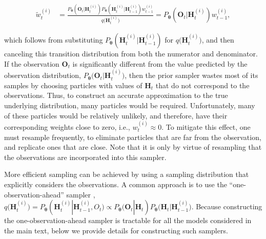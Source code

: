 \documentclass[10pt]{article}
\providecommand{\ve}[1]{\boldsymbol{#1}}
\providecommand{\ve}[1]{\boldsymbol{#1}}
\newcommand{\thetn}{\ve{\theta}}
\newcommand{\p}{P_{\thetn}}
\newcommand{\q}{q\big(\ve{H}_t^{(i)}\big)}
\begin{document}
\begin{align} \label{eq:prior_weights}
\widetilde{w}_t^{(i)} &= \frac{\p(\ve{O}_t | \ve{H}_t^{(i)})  \p(\ve{H}_t^{(i)} | \ve{H}_{t-1}^{(i)}) w_{t-1}^{(i)}}{\q} %
=\p(\ve{O}_t | \ve{H}_t^{(i)}) w_{t-1}^{(i)},
\end{align}

\noindent which follows from substituting $\p(\ve{H}_t^{(i)} | \ve{H}_{t-1}^{(i)})$ for $\q$, and then canceling this transition distribution from both the numerator and denominator. If the observation $\ve{O}_t$ is significantly different from the value predicted by the observation distribution, $\p\big(\ve{O}_t | \ve{H}_t^{(i)}\big)$, then the prior sampler wastes most of its samples by choosing particles with values of $\ve{H}_t$ that do not correspond to the observations.  Thus, to construct an accurate approximation to the true underlying distribution, many particles would be required. Unfortunately, many of these particles would be relatively unlikely, and therefore, have their corresponding weights close to zero, i.e., $w_t^{(i)} \approx 0$.  To mitigate this effect, one must resample frequently, to eliminate particles that are far from the observation, and replicate ones that are close. Note that it is only by virtue of resampling that the observations are incorporated into this sampler.

More efficient sampling can be achieved by using a sampling distribution that explicitly considers the observations.  A common approach is to use the ``one-observation-ahead'' sampler \cite{DoucetGordon01}, $\q = \p(\ve{H}_t^{(i)} | \ve{H}_{t-1}^{(i)}, O_t) \propto \p(\ve{O}_t | \ve{H}_t) \p\big(\ve{H}_t | \ve{H}_{t-1}^{(i)}\big)$. Because constructing the one-observation-ahead sampler is tractable for all the models considered in the main text, below we provide details for constructing such samplers.

\end{document}
